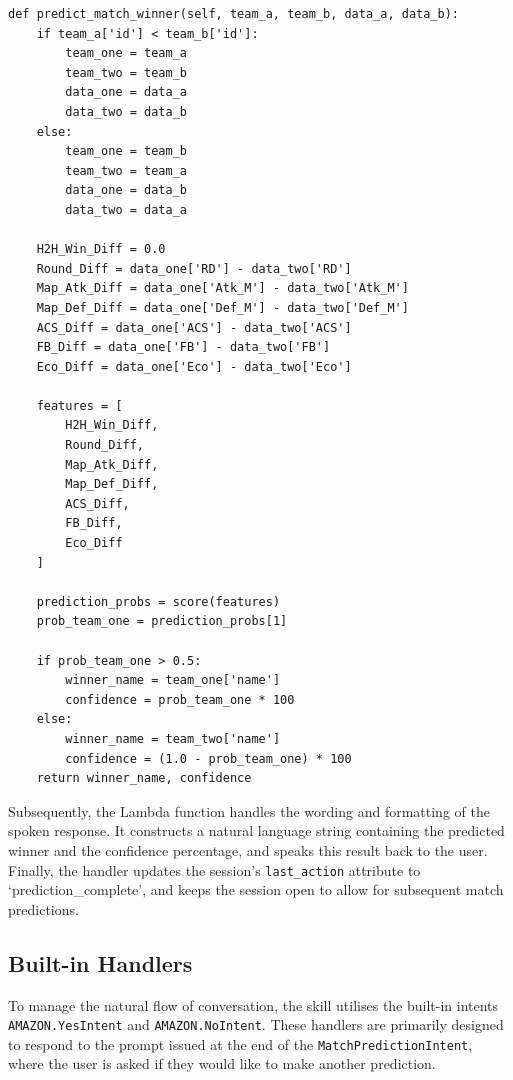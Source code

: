 \begin{lstlisting}[style=code, caption={Method to standardise input order, calculate feature differentials, and execute the prediction model.}]
def predict_match_winner(self, team_a, team_b, data_a, data_b):
    if team_a['id'] < team_b['id']:
        team_one = team_a
        team_two = team_b
        data_one = data_a
        data_two = data_b
    else:
        team_one = team_b
        team_two = team_a
        data_one = data_b
        data_two = data_a

    H2H_Win_Diff = 0.0
    Round_Diff = data_one['RD'] - data_two['RD']
    Map_Atk_Diff = data_one['Atk_M'] - data_two['Atk_M']
    Map_Def_Diff = data_one['Def_M'] - data_two['Def_M']
    ACS_Diff = data_one['ACS'] - data_two['ACS']
    FB_Diff = data_one['FB'] - data_two['FB']
    Eco_Diff = data_one['Eco'] - data_two['Eco']

    features = [
        H2H_Win_Diff,
        Round_Diff,
        Map_Atk_Diff,
        Map_Def_Diff,
        ACS_Diff,
        FB_Diff,
        Eco_Diff
    ]

    prediction_probs = score(features)
    prob_team_one = prediction_probs[1]

    if prob_team_one > 0.5:
        winner_name = team_one['name']
        confidence = prob_team_one * 100
    else:
        winner_name = team_two['name']
        confidence = (1.0 - prob_team_one) * 100
    return winner_name, confidence
\end{lstlisting}

Subsequently, the Lambda function handles the wording and formatting of the spoken response. It constructs a natural language string containing the predicted winner and the confidence percentage, and speaks this result back to the user. Finally, the handler updates the session's \texttt{last_action} attribute to `prediction_complete', and keeps the session open to allow for subsequent match predictions.

\subsection{Built-in Handlers}

To manage the natural flow of conversation, the skill utilises the built-in intents \texttt{AMAZON.YesIn\-tent} and \texttt{AMAZON.NoIntent}. These handlers are primarily designed to respond to the prompt issued at the end of the \texttt{MatchPredictionIntent}, where the user is asked if they would like to make another prediction.

